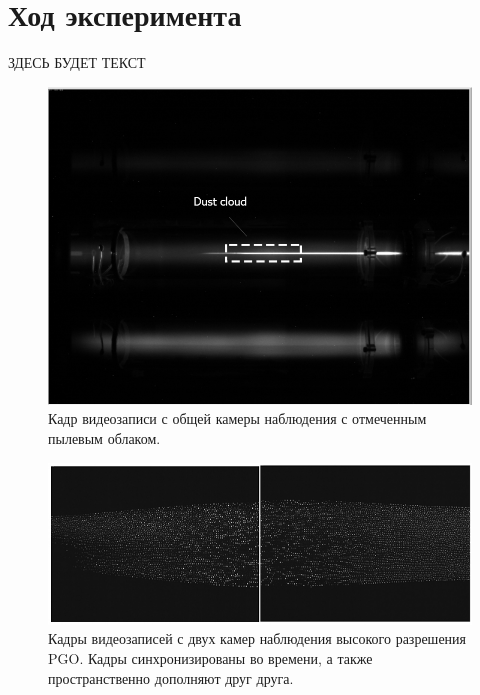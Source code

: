 \section{Ход эксперимента}
ЗДЕСЬ БУДЕТ ТЕКСТ
\begin{figure}[t]
  \centering
  \includegraphics[width=14cm]{figures/common_camera}
  \caption{Кадр видеозаписи с общей камеры наблюдения с отмеченным пылевым облаком.}
  \label{fig:common_camera}
\end{figure}

\begin{figure}[t]
  \centering
  \includegraphics[width=16cm]{figures/high_resolution_cameras}
  \caption{Кадры видеозаписей с двух камер наблюдения высокого разрешения PGO. Кадры синхронизированы во времени, а также пространственно дополняют друг друга.}
  \label{fig:high_resolution_cameras}
\end{figure}

